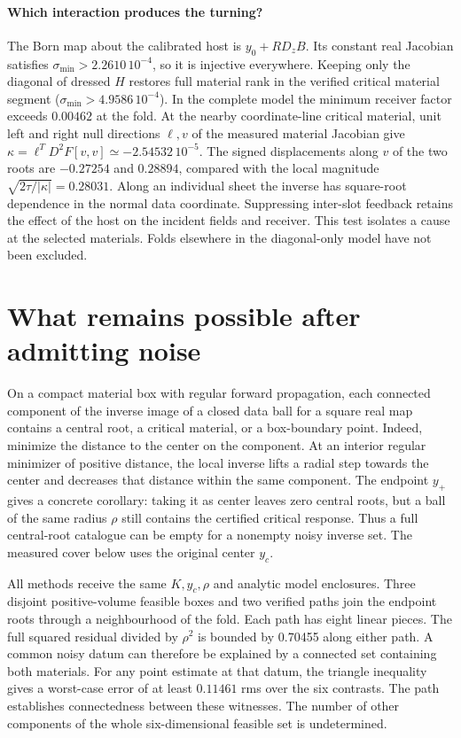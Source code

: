 \documentclass[10pt]{article}
\begin{document}
\paragraph{Which interaction produces the turning?}
The Born map about the calibrated host is $y_0+RD_zB$. Its constant real Jacobian satisfies $\sigma_{\min}>2.2610\,10^{-4}$, so it is injective everywhere. Keeping only the diagonal of dressed $H$ restores full material rank in the verified critical material segment ($\sigma_{\min}>4.9586\,10^{-4}$). In the complete model the minimum receiver factor exceeds $0.00462$ at the fold. At the nearby coordinate-line critical material, unit left and right null directions $\ell,v$ of the measured material Jacobian give $\kappa=\ell^T D^2F[v,v]\simeq-2.54532\,10^{-5}$. The signed displacements along $v$ of the two roots are $-0.27254$ and $0.28894$, compared with the local magnitude $\sqrt{2\tau/|\kappa|}=0.28031$. Along an individual sheet the inverse has square-root dependence in the normal data coordinate. Suppressing inter-slot feedback retains the effect of the host on the incident fields and receiver. This test isolates a cause at the selected materials. Folds elsewhere in the diagonal-only model have not been excluded.

\section{What remains possible after admitting noise}
On a compact material box with regular forward propagation, each connected component of the inverse image of a closed data ball for a square real map contains a central root, a critical material, or a box-boundary point. Indeed, minimize the distance to the center on the component. At an interior regular minimizer of positive distance, the local inverse lifts a radial step towards the center and decreases that distance within the same component. The endpoint $y_+$ gives a concrete corollary: taking it as center leaves zero central roots, but a ball of the same radius $\rho$ still contains the certified critical response. Thus a full central-root catalogue can be empty for a nonempty noisy inverse set. The measured cover below uses the original center $y_c$.

All methods receive the same $K,y_c,\rho$ and analytic model enclosures. Three disjoint positive-volume feasible boxes and two verified paths join the endpoint roots through a neighbourhood of the fold. Each path has eight linear pieces. The full squared residual divided by $\rho^2$ is bounded by 0.70455 along either path. A common noisy datum can therefore be explained by a connected set containing both materials. For any point estimate at that datum, the triangle inequality gives a worst-case error of at least $0.11461$ rms over the six contrasts. The path establishes connectedness between these witnesses. The number of other components of the whole six-dimensional feasible set is undetermined.
\end{document}
